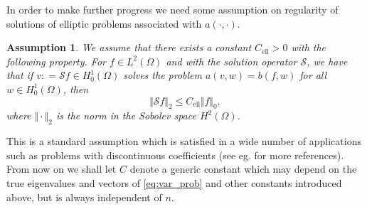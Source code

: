 \documentclass[preprint,12pt]{elsarticle}
\newtheorem{assumption}[theorem]{Assumption}
\newcommand{\cS}{\mathcal{S}}
\begin{document}
In order to make further progress we need some assumption on
regularity of solutions of elliptic problems associated with $a(\cdot,
\cdot)$.
\begin{assumption}\label{ass:ell}
 We assume that there exists a constant
$C_\mathrm{ell}>0$ with the following property.
For   $f \in L^2(\Omega)$ and with the solution operator $\cS$, we have that if  $v: = \cS f\in H^1_0(\Omega)$ solves  the
problem {$a(v,w) = b(f,w) $} for all $w \in
H^1_0(\Omega)$, then 
\begin{equation}\label{eq:ass_reg_pcf}
\Vert \cS f \Vert_{{2}} \leq
C_\mathrm{ell}\Vert f \Vert_0,
\end{equation}
where  $\Vert \cdot \Vert_{2}$ is the norm in   the Sobolev space $H^{2}(\Omega)$.
\end{assumption}
This is a standard assumption which is satisfied in a wide number of
applications such as problems with discontinuous coefficients
(see eg. \cite{conv_sinum} for more references).\\

From now on we shall let $C$ denote  a generic constant which 
may depend
on the 
true eigenvalues and vectors of \eqref{eq:var_prob} and other
constants introduced above, but is always independent of
$n$. 
\end{document}
